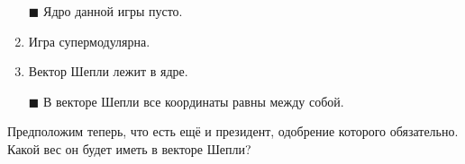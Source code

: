 \begin{enumerate}[label=$\square$]
	
	
	
	
	\item[$\blacksquare$] Ядро данной игры пусто.
	\item Игра супермодулярна.
	\item Вектор Шепли лежит в ядре.
	\item[$\blacksquare$] В векторе Шепли все координаты равны между собой.
\end{enumerate}

\task
Предположим теперь, что есть ещё и президент, одобрение которого обязательно. Какой вес он будет иметь в векторе Шепли?

